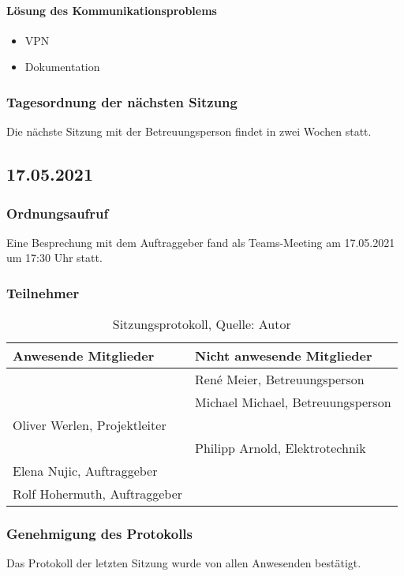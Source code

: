 \paragraph{Lösung des Kommunikationsproblems}
\begin{itemize}
	\item VPN
	\item Dokumentation
\end{itemize}
\subsubsection{Tagesordnung der nächsten Sitzung}
Die nächste Sitzung mit der Betreuungsperson findet in zwei Wochen statt. 
\newpage
\subsection{17.05.2021}
\subsubsection{Ordnungsaufruf}
Eine Besprechung mit dem Auftraggeber fand als Teams-Meeting am 17.05.2021 um 17:30 Uhr statt. 
\subsubsection{Teilnehmer}
\begin{table}[H]
	\setlength\extrarowheight{2pt} %
	\begin{tabularx}{\textwidth}{|X|X|}
		\hline
		\textbf{Anwesende Mitglieder} &  \textbf{Nicht anwesende Mitglieder} \\
		\hline
		&  René Meier, Betreuungsperson   \\
		& Michael Michael, Betreuungsperson   \\
		Oliver Werlen, Projektleiter &  \\
		& Philipp Arnold, Elektrotechnik \\
		Elena Nujic, Auftraggeber &  \\
		Rolf Hohermuth, Auftraggeber &  \\
		\hline
	\end{tabularx}
	\caption{ \label{tbl: Teilnehmerliste vom 17.05.2021}Sitzungsprotokoll, Quelle: Autor}
\end{table}
\subsubsection{Genehmigung des Protokolls}
Das Protokoll der letzten Sitzung wurde von allen Anwesenden bestätigt.
